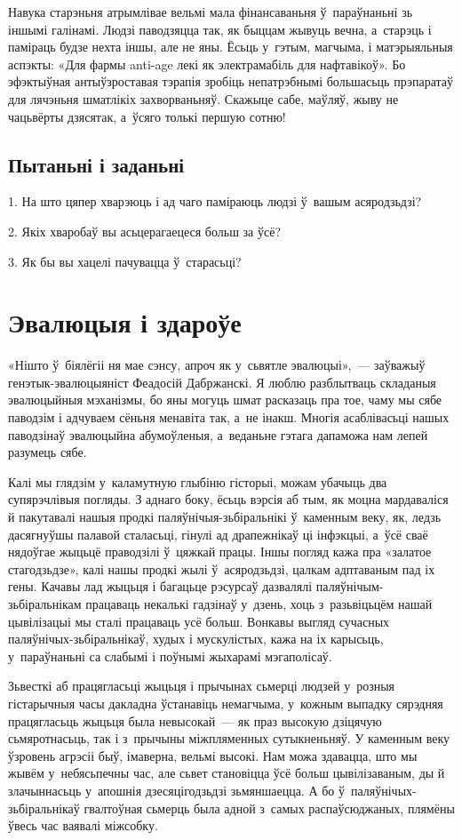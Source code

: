Навука старэньня атрымлівае вельмі мала фінансаваньня ў~параўнаньні зь іншымі галінамі. Людзі паводзяцца так, як быццам жывуць вечна, а~старэць і паміраць будзе нехта іншы, але не яны. Ёсьць у~гэтым, магчыма, і матэрыяльныя аспэкты: «Для фармы anti-age лекі як электрамабіль для нафтавікоў». Бо эфэктыўная антыўзроставая тэрапія зробіць непатрэбнымі большасьць прэпаратаў для лячэньня шматлікіх захворваньняў. Скажыце сабе, маўляў, жыву не чацьвёрты дзясятак, а~ўсяго толькі першую сотню!


\subsection*{Пытаньні і заданьні}

1. На што цяпер хварэюць і ад чаго паміраюць людзі ў~вашым асяродзьдзі?

2. Якіх хваробаў вы асьцерагаецеся больш за ўсё?

3. Як бы вы хацелі пачувацца ў~старасьці?


\section{Эвалюцыя і здароўе}

«Нішто ў~біялёгіі ня мае сэнсу, апроч як у~сьвятле эвалюцыі»,~--- заўважыў генэтык-эвалюцыяніст Феадосій Дабржанскі. Я люблю разблытваць складаныя эвалюцыйныя мэханізмы, бо яны могуць шмат расказаць пра тое, чаму мы сябе паводзім і адчуваем сёньня менавіта так, а~не інакш. Многія асаблівасьці нашых паводзінаў эвалюцыйна абумоўленыя, а~веданьне гэтага дапаможа нам лепей разумець сябе.

Калі мы глядзім у~каламутную глыбіню гісторыі, можам убачыць два супярэчлівыя погляды. З аднаго боку, ёсьць вэрсія аб тым, як моцна мардаваліся й пакутавалі нашыя продкі паляўнічыя-зьбіральнікі ў~каменным веку, як, ледзь дасягнуўшы палавой сталасьці, гінулі ад драпежнікаў ці інфэкцыі, а~ўсё сваё нядоўгае жыцьцё праводзілі ў~цяжкай працы. Іншы погляд кажа пра «залатое стагодзьдзе», калі нашы продкі жылі ў~асяродзьдзі, цалкам адптаваным пад іх гены. Качавы лад жыцьця і багацьце рэсурсаў дазвалялі паляўнічым-зьбіральнікам працаваць некалькі гадзінаў у~дзень, хоць з~разьвіцьцём нашай цывілізацыі мы сталі працаваць усё больш. Вонкавы выгляд сучасных паляўнічых-зьбіральнікаў, худых і мускулістых, кажа на іх карысьць, у~параўнаньні са слабымі і поўнымі жыхарамі мэгаполісаў.

Зьвесткі аб працягласьці жыцьця і прычынах сьмерці людзей у~розныя гістарычныя часы дакладна ўстанавіць немагчыма, у~кожным выпадку сярэдняя працягласьць жыцьця была невысокай~--- як праз высокую дзіцячую сьмяротнасьць, так і з~прычыны міжпляменных сутыкненьняў. У каменным веку ўзровень агрэсіі быў, імаверна, вельмі высокі. Нам можа здавацца, што мы жывём у~небясьпечны час, але сьвет становіцца ўсё больш цывілізаваным, ды й злачыннасьць у~апошнія дзесяцігодзьдзі зьмяншаецца. А бо ў~паляўнічых-зьбіральнікаў гвалтоўная сьмерць была адной з~самых распаўсюджаных, плямёны ўвесь час ваявалі міжсобку. 

